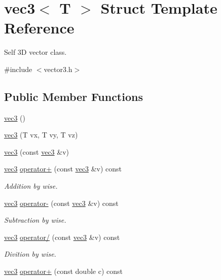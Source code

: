 \hypertarget{structvec3}{}\section{vec3$<$ T $>$ Struct Template Reference}
\label{structvec3}


Self 3D vector class.  




{\ttfamily \#include $<$vector3.\+h$>$}

\subsection*{Public Member Functions}
\begin{DoxyCompactItemize}
\item 
\mbox{\hyperlink{structvec3_afb7342872bc442bf0da6a7da1671e77e}{vec3}} ()
\item 
\mbox{\hyperlink{structvec3_a9cdcc79d7383d2676ae1f5701c481607}{vec3}} (T vx, T vy, T vz)
\item 
\mbox{\hyperlink{structvec3_ac0d73cf98ccc9b3cb39e6f58e92dab9f}{vec3}} (const \mbox{\hyperlink{structvec3}{vec3}} \&v)
\item 
\mbox{\hyperlink{structvec3}{vec3}} \mbox{\hyperlink{structvec3_a255037f59863e54390e388dd07e7ee8f}{operator+}} (const \mbox{\hyperlink{structvec3}{vec3}} \&v) const
\begin{DoxyCompactList}\small\item\em Addition by wise. \end{DoxyCompactList}\item 
\mbox{\hyperlink{structvec3}{vec3}} \mbox{\hyperlink{structvec3_a62ca43535073d9711fe179e26a412e32}{operator-\/}} (const \mbox{\hyperlink{structvec3}{vec3}} \&v) const
\begin{DoxyCompactList}\small\item\em Subtraction by wise. \end{DoxyCompactList}\item 
\mbox{\hyperlink{structvec3}{vec3}} \mbox{\hyperlink{structvec3_ad2f8afc304554e7b5d7331030e8bc91d}{operator/}} (const \mbox{\hyperlink{structvec3}{vec3}} \&v) const
\begin{DoxyCompactList}\small\item\em Divition by wise. \end{DoxyCompactList}\item 
\mbox{\hyperlink{structvec3}{vec3}} \mbox{\hyperlink{structvec3_a479dd2445daeeec47e6a5a8e4487f51b}{operator+}} (const double c) const

\end{DoxyCompactItemize}
